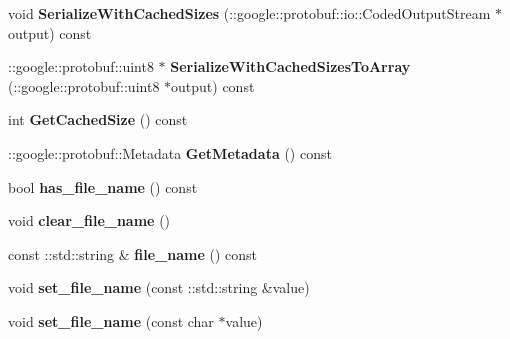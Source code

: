 \begin{DoxyCompactItemize}
void {\bfseries Serialize\+With\+Cached\+Sizes} (\+::google\+::protobuf\+::io\+::\+Coded\+Output\+Stream $\ast$output) const
\item 
\mbox{\label{classcaffe_1_1_h_d_f5_output_parameter_a69d77cf826eeb2e900f5aea2361ce2cb}} 
\+::google\+::protobuf\+::uint8 $\ast$ {\bfseries Serialize\+With\+Cached\+Sizes\+To\+Array} (\+::google\+::protobuf\+::uint8 $\ast$output) const
\item 
\mbox{\label{classcaffe_1_1_h_d_f5_output_parameter_a35f800c9f7d53afa205e7c49917d943e}} 
int {\bfseries Get\+Cached\+Size} () const
\item 
\mbox{\label{classcaffe_1_1_h_d_f5_output_parameter_a8d3b7b499cada74f22b1312aa6a792af}} 
\+::google\+::protobuf\+::\+Metadata {\bfseries Get\+Metadata} () const
\item 
\mbox{\label{classcaffe_1_1_h_d_f5_output_parameter_ae0395af33c645bd06342b0dbeb12cefb}} 
bool {\bfseries has\+\_\+file\+\_\+name} () const
\item 
\mbox{\label{classcaffe_1_1_h_d_f5_output_parameter_a5d926394ad0499aa541005cbb569e0ba}} 
void {\bfseries clear\+\_\+file\+\_\+name} ()
\item 
\mbox{\label{classcaffe_1_1_h_d_f5_output_parameter_a69e54b242f68bb42dab623dbef9d7755}} 
const \+::std\+::string \& {\bfseries file\+\_\+name} () const
\item 
\mbox{\label{classcaffe_1_1_h_d_f5_output_parameter_aeb53aaabf14418c57fcea1064e4ea5a7}} 
void {\bfseries set\+\_\+file\+\_\+name} (const \+::std\+::string \&value)
\item 
\mbox{\label{classcaffe_1_1_h_d_f5_output_parameter_a1acb8007e052a076cc9a1aa837f11068}} 
void {\bfseries set\+\_\+file\+\_\+name} (const char $\ast$value)
\item 
\mbox{\label{classcaffe_1_1_h_d_f5_output_parameter_a227527ca4dfef7d331d274255c53d001}} 

\end{DoxyCompactItemize}
